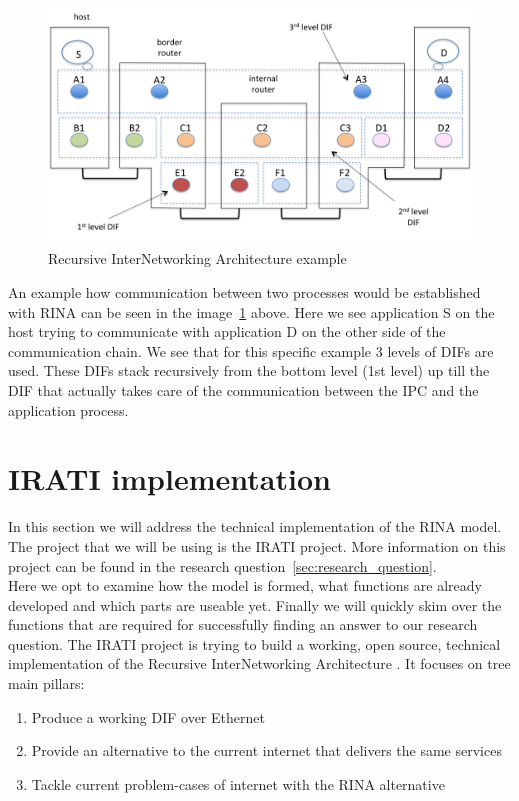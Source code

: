 \npar
\begin{figure}[H]
    \centering
    \includegraphics[width=\textwidth]{figures/rina-architecture}
    \caption{Recursive InterNetworking Architecture example \citep{website:irati}} 
    \label{fig:RINAexample}
\end{figure}
\npar
An example how communication between two processes would be established with RINA can be seen in the image~\ref{fig:RINAexample} above. Here we see application S on the host trying to communicate with application D on the other side of the communication chain. We see that for this specific example 3 levels of DIFs are used. These DIFs stack recursively from the bottom level (1st level) up till the DIF that actually takes care of the communication between the IPC and the application process. 


\section{IRATI implementation}
In this section we will address the technical implementation of the RINA model. The project that we will be using is the IRATI project. More information on this project can be found in the research question~\ref{sec:research_question}. 
\\
Here we opt to examine how the model is formed, what functions are already developed and which parts are useable yet. Finally we will quickly skim over the functions that are required for successfully finding an answer to our research question. 
\npar
The IRATI project is trying to build a working, open source, technical implementation of the Recursive InterNetworking Architecture \citep{website:irati_obj}. It focuses on tree main pillars: 

\begin{enumerate}
	\item Produce a working DIF over Ethernet 
	\item Provide an alternative to the current internet that delivers the same services
	\item Tackle current problem-cases of internet with the RINA alternative
\end{enumerate}

